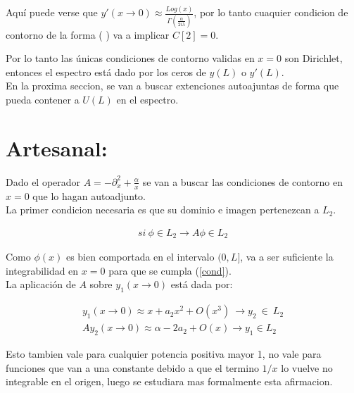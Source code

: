 Aquí puede verse que $y' (x \rightarrow 0 ) \approx  \frac{ Log (x) }{\Gamma \left( \frac{\alpha}{2 i \lambda}\right)} $, por lo tanto cuaquier condicion de contorno de la forma ( \label{eq.phi} ) va a implicar $C[2] = 0$.
 
Por lo tanto las únicas condiciones de contorno validas en $x=0$ son Dirichlet,  entonces el espectro está dado por los ceros de $y(L)$ o $y'(L)$. \\



En la proxima seccion, se van a  buscar extenciones autoajuntas de forma que pueda contener a $U(L)$ en el espectro.


\section{Artesanal:}

Dado el operador $A = - \partial ^2 _x + \frac{\alpha}{x}  $ se van a buscar las condiciones de contorno en $x=0$ que lo hagan autoadjunto.\\

La primer condicion necesaria es que su dominio e imagen pertenezcan a $L _2$.

\begin{equation}
\begin{array}{c}
si \ \phi \in L _2 \rightarrow A \phi \in L _2
\end{array}
\label{cond}
\end{equation}


Como $\phi (x)$ es bien comportada en el intervalo $(0,L]$, va a ser suficiente la integrabilidad en $x=0$ para que se cumpla (\ref{cond}). \\


La aplicación de $A$ sobre $y _1 (x \rightarrow 0)$ está dada por:


\begin{equation}
\begin{array}{c}
y _1 (x \rightarrow 0) \approx x + a _2 x ^2 + O (x ^3 ) \ \rightarrow y _2 \ \in \ L _2 \\
A y _2 (x \rightarrow 0) \approx \alpha - 2 a_2 + O(x ) \rightarrow y _1\in L _2
\end{array}
\label{eq.chico1}
\end{equation}

Esto tambien vale para cualquier potencia positiva mayor 1, no vale para funciones que van a una constante debido a que el termino $1/x$ lo vuelve no integrable en el origen, luego se estudiara mas formalmente esta afirmacion.

